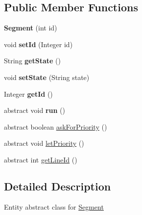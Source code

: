 \subsection*{Public Member Functions}
\begin{DoxyCompactItemize}
\item 
\mbox{\label{classmondragon_1_1edu_1_1clases_1_1_segment_a7d65fcd7ac44affe1cc08db236af8288}} 
{\bfseries Segment} (int id)
\item 
\mbox{\label{classmondragon_1_1edu_1_1clases_1_1_segment_a94f400cd8b4b9e542b5fc61d70aea962}} 
void {\bfseries set\+Id} (Integer id)
\item 
\mbox{\label{classmondragon_1_1edu_1_1clases_1_1_segment_aea2659c660c6253ff57d1c2a990df02e}} 
String {\bfseries get\+State} ()
\item 
\mbox{\label{classmondragon_1_1edu_1_1clases_1_1_segment_ad11a5c89260624a60d430d93bd2ff444}} 
void {\bfseries set\+State} (String state)
\item 
\mbox{\label{classmondragon_1_1edu_1_1clases_1_1_segment_ae6ae807c1ba8eb8e9b657a649812b5a8}} 
Integer {\bfseries get\+Id} ()
\item 
\mbox{\label{classmondragon_1_1edu_1_1clases_1_1_segment_a18118ddb6c456446fa57e226e9077d89}} 
abstract void {\bfseries run} ()
\item 
abstract boolean \mbox{\hyperlink{classmondragon_1_1edu_1_1clases_1_1_segment_a0ee7818c127f5117a723b8fece868030}{ask\+For\+Priority}} ()
\item 
abstract void \mbox{\hyperlink{classmondragon_1_1edu_1_1clases_1_1_segment_af903bad2ccfd51fe2f8d21d437143a1e}{let\+Priority}} ()
\item 
abstract int \mbox{\hyperlink{classmondragon_1_1edu_1_1clases_1_1_segment_af905b954e40e0c3d5b58673b03b972cc}{get\+Line\+Id}} ()
\end{DoxyCompactItemize}


\subsection{Detailed Description}
Entity abstract class for \mbox{\hyperlink{classmondragon_1_1edu_1_1clases_1_1_segment}{Segment}}

